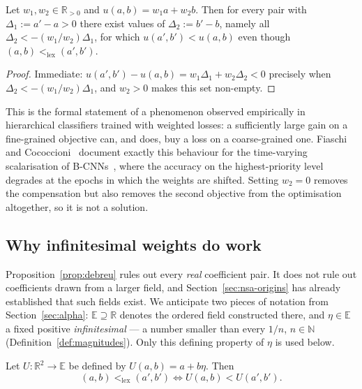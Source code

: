 \begin{corollary}
\label{cor:compensation}
Let $w_1, w_2 \in \mathbb{R}_{>0}$ and $u(a,b) = w_1 a + w_2 b$. Then for every pair
with $\Delta_1 := a' - a > 0$ there exist values of $\Delta_2 := b' - b$, namely all
$\Delta_2 < -(w_1/w_2)\Delta_1$, for which $u(a',b') < u(a,b)$ even though
$(a,b) <_{\mathrm{lex}} (a',b')$.
\end{corollary}

\begin{proof}
Immediate: $u(a',b') - u(a,b) = w_1\Delta_1 + w_2\Delta_2 < 0$ precisely when
$\Delta_2 < -(w_1/w_2)\Delta_1$, and $w_2 > 0$ makes this set non-empty.
\end{proof}

This is the formal statement of a phenomenon observed empirically in hierarchical
classifiers trained with weighted losses: a sufficiently large gain on a fine-grained
objective can, and does, buy a loss on a coarse-grained one. Fiaschi and
Cococcioni~\cite{fiaschi2024informed} document exactly this behaviour for the
time-varying scalarisation of B-CNNs~\cite{zhu2017bcnn}, where the accuracy on the
highest-priority level degrades at the epochs in which the weights are shifted.
Setting $w_2=0$ removes the compensation but also removes the second objective from
the optimisation altogether, so it is not a solution.

\subsection{Why infinitesimal weights do work}
\label{sec:lexico-nonstd}

Proposition~\ref{prop:debreu} rules out every \emph{real} coefficient pair. It does
not rule out coefficients drawn from a larger field, and
Section~\ref{sec:nsa-origins} has already established that such fields exist. We
anticipate two pieces of notation from Section~\ref{sec:alpha}:
$\mathbb{E} \supseteq \mathbb{R}$ denotes the ordered field constructed there, and
$\eta \in \mathbb{E}$ a fixed positive \emph{infinitesimal} --- a number smaller than
every $1/n$, $n \in \mathbb{N}$ (Definition~\ref{def:magnitudes}). Only this defining
property of $\eta$ is used below.

\begin{proposition}
\label{prop:e-representation}
Let $U : \mathbb{R}^{2} \to \mathbb{E}$ be defined by $U(a,b) = a + b\eta$. Then
\[
  (a,b) <_{\mathrm{lex}} (a',b') \iff U(a,b) < U(a',b').
\]
\end{proposition}

